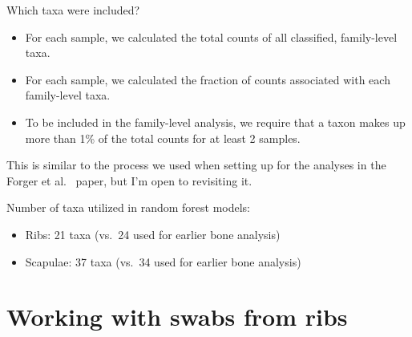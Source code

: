\documentclass{beamer}
\begin{document}
\begin{frame}{Which taxa were included?}

  \begin{itemize}
  \item For each sample, we calculated the total counts of all classified,
family-level taxa.
  \item For each sample, we calculated the fraction of counts
associated with each family-level taxa. 
  \item To be included in the family-level analysis, we require that a taxon
  makes up more than 1\% of the total counts for at least 2 samples.
  \end{itemize}

  \vspace{0.1in}

  \noindent This is similar to the process we used when setting up for the
analyses in the Forger et al.~ paper, but I'm open to revisiting it.

  \vspace{0.1in}

  \noindent Number of taxa utilized in random forest models:
  \begin{itemize}
    \item Ribs: 21 taxa (vs.\ 24 used for earlier bone analysis)
    \item Scapulae: 37 taxa (vs.\ 34 used for earlier bone analysis)
  \end{itemize}


\end{frame}



\section[Rib swabs]{Working with swabs from ribs}
\end{document}
